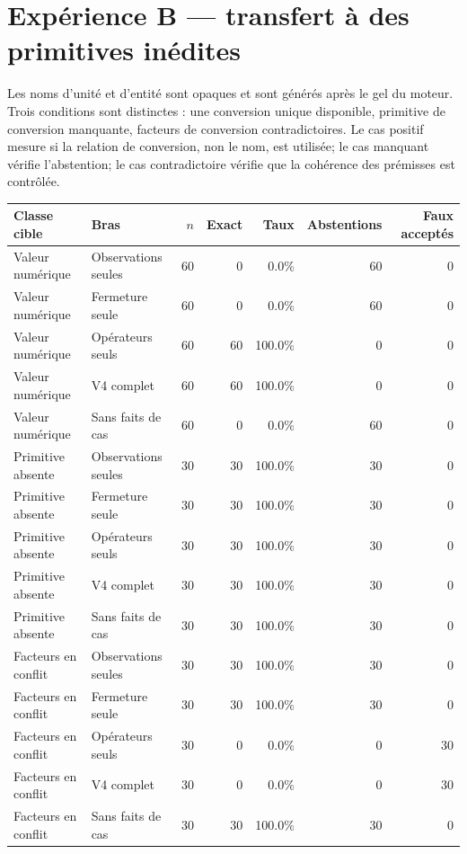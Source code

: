 \documentclass[11pt,a4paper]{article}
\begin{document}
\section{Expérience B — transfert à des primitives inédites}

Les noms d’unité et d’entité sont opaques et sont générés après le gel du moteur. Trois conditions sont distinctes : une conversion unique disponible, primitive de conversion manquante, facteurs de conversion contradictoires. Le cas positif mesure si la relation de conversion, non le nom, est utilisée; le cas manquant vérifie l’abstention; le cas contradictoire vérifie que la cohérence des prémisses est contrôlée.

\scriptsize\setlength{\tabcolsep}{1.5pt}
\begin{longtable}{p{}p{}rrrrr}
\toprule Classe cible & Bras & $n$ & Exact & Taux & Abstentions & Faux acceptés \\
\midrule

Valeur numérique & Observations seules & 60 & 0 & 0.0\% & 60 & 0 \\
Valeur numérique & Fermeture seule & 60 & 0 & 0.0\% & 60 & 0 \\
Valeur numérique & Opérateurs seuls & 60 & 60 & 100.0\% & 0 & 0 \\
Valeur numérique & V4 complet & 60 & 60 & 100.0\% & 0 & 0 \\
Valeur numérique & Sans faits de cas & 60 & 0 & 0.0\% & 60 & 0 \\
Primitive absente & Observations seules & 30 & 30 & 100.0\% & 30 & 0 \\
Primitive absente & Fermeture seule & 30 & 30 & 100.0\% & 30 & 0 \\
Primitive absente & Opérateurs seuls & 30 & 30 & 100.0\% & 30 & 0 \\
Primitive absente & V4 complet & 30 & 30 & 100.0\% & 30 & 0 \\
Primitive absente & Sans faits de cas & 30 & 30 & 100.0\% & 30 & 0 \\
Facteurs en conflit & Observations seules & 30 & 30 & 100.0\% & 30 & 0 \\
Facteurs en conflit & Fermeture seule & 30 & 30 & 100.0\% & 30 & 0 \\
Facteurs en conflit & Opérateurs seuls & 30 & 0 & 0.0\% & 0 & 30 \\
Facteurs en conflit & V4 complet & 30 & 0 & 0.0\% & 0 & 30 \\
Facteurs en conflit & Sans faits de cas & 30 & 30 & 100.0\% & 30 & 0 \\
\bottomrule
\end{longtable}
\normalsize\setlength{\tabcolsep}{6pt}
\end{document}

